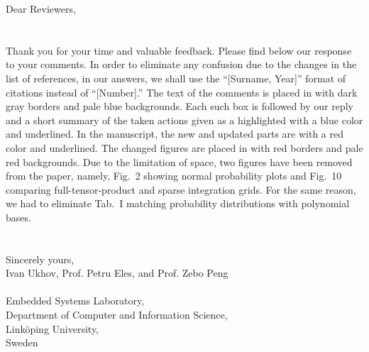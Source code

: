 Dear Reviewers,
\\
\\
\\
\noindent Thank you for your time and valuable feedback.
Please find below our response to your comments.
In order to eliminate any confusion due to the changes in the list of references, in our answers, we shall use the ``[Surname, Year]'' format of citations instead of ``[Number].''
The text of the comments is placed in  with dark gray borders and pale blue backgrounds.
Each such box is followed by our reply and a short summary of the taken actions given as a  highlighted with a blue color and underlined.
In the manuscript, the new and updated parts are  with a red color and underlined.
The changed figures are placed in  with red borders and pale red backgrounds.
Due to the limitation of space, two figures have been removed from the paper, namely, Fig.~2 showing normal probability plots and Fig.~10 comparing full-tensor-product and sparse integration grids.
For the same reason, we had to eliminate Tab.~I matching probability distributions with polynomial bases.
\\
\\
\\
\noindent Sincerely yours,\\
Ivan Ukhov, Prof. Petru Eles, and Prof. Zebo Peng
\\
\\
\noindent Embedded Systems Laboratory,\\
Department of Computer and Information Science,\\
Link\"{o}ping University,\\
Sweden
